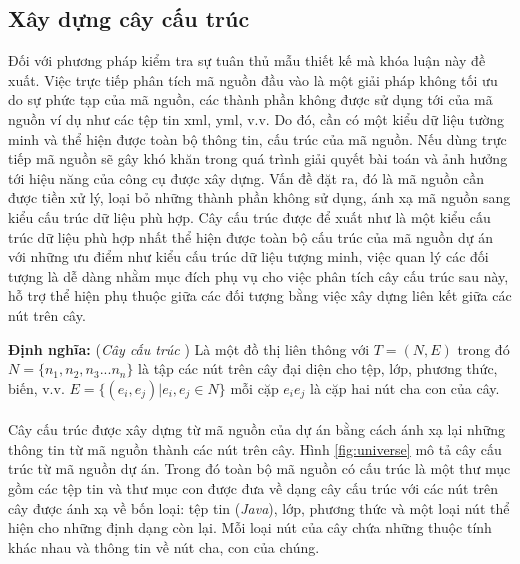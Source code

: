 \documentclass[12pt]{report}
\begin{document}
\subsection{Xây dựng cây cấu trúc}
Đối với phương pháp kiểm tra sự tuân thủ mẫu thiết kế mà khóa luận này đề xuất. Việc trực tiếp phân tích mã nguồn đầu vào là một giải pháp không tối ưu do sự phức tạp của mã nguồn, các thành phần không được sử dụng tới của mã nguồn ví dụ như các tệp tin xml, yml, v.v. Do đó, cần có một kiểu dữ liệu tường minh và thể hiện được toàn bộ thông tin, cấu trúc của mã nguồn. Nếu dùng trực tiếp mã nguồn sẽ gây khó khăn trong quá trình giải quyết bài toán và ảnh hưởng tới hiệu năng của công cụ được xây dựng. Vấn đề đặt ra, đó là mã nguồn cần được tiền xử lý, loại bỏ những thành phần không sử dụng, ánh xạ mã nguồn sang kiểu cấu trúc dữ liệu phù hợp. Cây cấu trúc được để xuất như là một kiểu cấu trúc dữ liệu phù hợp nhất thể hiện được toàn bộ cấu trúc của mã nguồn dự án với những ưu điểm như kiểu cấu trúc dữ liệu tượng minh, việc quan lý các đối tượng là dễ dàng nhằm mục đích phụ vụ cho việc phân tích cây cấu trúc sau này, hỗ trợ thể hiện phụ thuộc giữa các đối tượng bằng việc xây dựng liên kết giữa các nút trên cây.

\noindent \textbf{Định nghĩa: }(\textit{Cây cấu trúc} \cite{jcia}) Là một đồ thị liên thông với $T = (N,E)$ trong đó $N = \{n_1,n_2,n_3...n_n \}$ là tập các nút trên cây đại diện cho tệp, lớp, phương thức, biến, v.v. $E = \{(e_i,e_j) | e_i, e_j \in N \}$ mỗi cặp $e_ie_j$ là cặp hai nút cha con của cây.\\\\
Cây cấu trúc được xây dựng từ mã nguồn của dự án bằng cách ánh xạ lại những thông tin từ mã nguồn thành các nút trên cây. Hình \ref{fig:universe} mô tả cây cấu trúc từ mã nguồn dự án. Trong đó toàn bộ mã nguồn có cấu trúc là một thư mục gồm các tệp tin và thư mục con được đưa về dạng cây cấu trúc với các nút trên cây được ánh xạ về bốn loại: tệp tin (\textit{Java}), lớp, phương thức và một loại nút thể hiện cho những định dạng còn lại. Mỗi loại nút của cây chứa những thuộc tính khác nhau và thông tin về nút cha, con của chúng.
\end{document}
